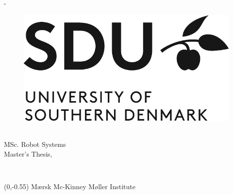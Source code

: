 \begin{titlingpage}
	\thispagestyle{empty}
	\enlargethispage{1.3cm}
	\calccentering{\unitlength}
	\begin{adjustwidth}{\unitlength}{-\unitlength}
		\vspace*{-1.9cm}
		\begin{figure} %
			\centering
			\includegraphics[width=.75\textwidth]{figures/front_matter/sdu_logo_uk-crop}
		\end{figure}

		\begin{centering}
			\begin{Spacing}{1.2}
				{\sffamily\HUGE\textbf{\ThTitleEN}\\[1cm]}
				{\sffamily\LARGE{MSc. Robot Systems}\\[1cm]}
				{\sffamily\LARGE{Master's Thesis, \ThEndDate}\\[1cm]}
			\end{Spacing}
			{\LARGE\sffamily\ThAuthors\\[2cm]}
		\end{centering}
		\begin{raggedright}
            \begin{textblock}{6.5}(0,-0.55)
    			\sffamily\LARGE{Mærsk Mc-Kinney Møller Institute}
            \end{textblock}
		\end{raggedright}
	\end{adjustwidth}


\end{titlingpage}

